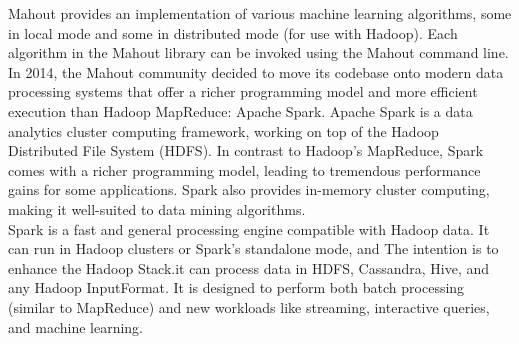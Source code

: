 Mahout provides an implementation of various machine learning algorithms, some in local mode and some in distributed mode (for use with Hadoop). Each algorithm in the Mahout library can be invoked using the Mahout command line.
\\
In 2014, the Mahout community decided to move its codebase onto modern data processing systems that offer a richer programming model and more efficient execution than Hadoop MapReduce: Apache Spark. Apache Spark is a data analytics cluster computing framework, working on top of the Hadoop Distributed File System (HDFS). In contrast to Hadoop’s MapReduce, Spark comes with a richer programming model, leading to tremendous performance gains for some applications. Spark also provides in-memory cluster computing, making it well-suited to data mining algorithms. 
\\
Spark is a fast and general processing engine compatible with Hadoop data. It can run in Hadoop clusters or Spark's standalone mode, and The intention is to enhance the Hadoop Stack.it can process data in HDFS, Cassandra, Hive, and any Hadoop InputFormat. It is designed to perform both batch processing (similar to MapReduce) and new workloads like streaming, interactive queries, and machine learning.


